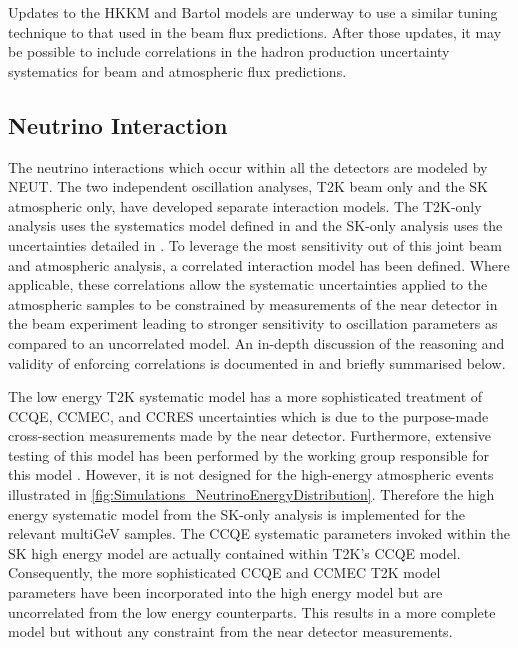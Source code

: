 Updates to the HKKM and Bartol models are underway to use a similar tuning technique to that used in the beam flux predictions. After those updates, it may be possible to include correlations in the hadron production uncertainty systematics for beam and atmospheric flux predictions.

\subsection{Neutrino Interaction}
\label{sec:SelsAndSysts_Systs_Interaction}

The neutrino interactions which occur within all the detectors are modeled by NEUT. The two independent oscillation analyses, T2K beam only and the SK atmospheric only, have developed separate interaction models. The T2K-only analysis uses the systematics model defined in \cite{t2k_tn_344} and the SK-only analysis uses the uncertainties detailed in \cite{Kamiokande_Collaboration2017-nf}. To leverage the most sensitivity out of this joint beam and atmospheric analysis, a correlated interaction model has been defined. Where applicable, these correlations allow the systematic uncertainties applied to the atmospheric samples to be constrained by measurements of the near detector in the beam experiment leading to stronger sensitivity to oscillation parameters as compared to an uncorrelated model. An in-depth discussion of the reasoning and validity of enforcing correlations is documented in \cite{t2k_tn_422} and briefly summarised below.

The low energy T2K systematic model has a more sophisticated treatment of CCQE, CCMEC, and CCRES uncertainties which is due to the purpose-made cross-section measurements made by the near detector. Furthermore, extensive testing of this model has been performed by the working group responsible for this model \cite{t2k_tn_344}. However, it is not designed for the high-energy atmospheric events illustrated in \autoref{fig:Simulations_NeutrinoEnergyDistribution}. Therefore the high energy systematic model from the SK-only analysis is implemented for the relevant multiGeV samples. The CCQE systematic parameters invoked within the SK high energy model are actually contained within T2K's CCQE model. Consequently, the more sophisticated CCQE and CCMEC T2K model parameters have been incorporated into the high energy model but are uncorrelated from the low energy counterparts. This results in a more complete model but without any constraint from the near detector measurements.

